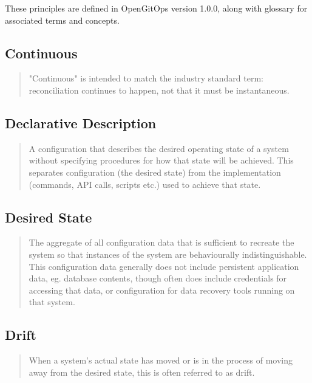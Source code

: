 
These principles are defined in OpenGitOps version 1.0.0,
along with glossary
\autocite{gitopsGlossary}
for associated terms and concepts.

\subsection*{Continuous}
\begin{quotation}
\noindent
"Continuous" is intended to match the industry standard term: reconciliation continues to happen, not that it must be instantaneous.
\autocite{gitopsGlossary}
\end{quotation}

\subsection*{Declarative Description}
\begin{quotation}
\noindent
A configuration that describes the desired operating state of a system without specifying procedures for how that state will be achieved. This separates configuration (the desired state) from the implementation (commands, API calls, scripts etc.) used to achieve that state.
\autocite{gitopsGlossary}
\end{quotation}

\subsection*{Desired State}
\begin{quotation}
\noindent
The aggregate of all configuration data that is sufficient to recreate the system so that instances of the system are behaviourally indistinguishable. This configuration data generally does not include persistent application data, eg. database contents, though often does include credentials for accessing that data, or configuration for data recovery tools running on that system.
\autocite{gitopsGlossary}
\end{quotation}

\subsection*{Drift}
\begin{quotation}
\noindent
When a system's actual state has moved or is in the process of moving away from the desired state, this is often referred to as drift.
\autocite{gitopsGlossary}
\end{quotation}

